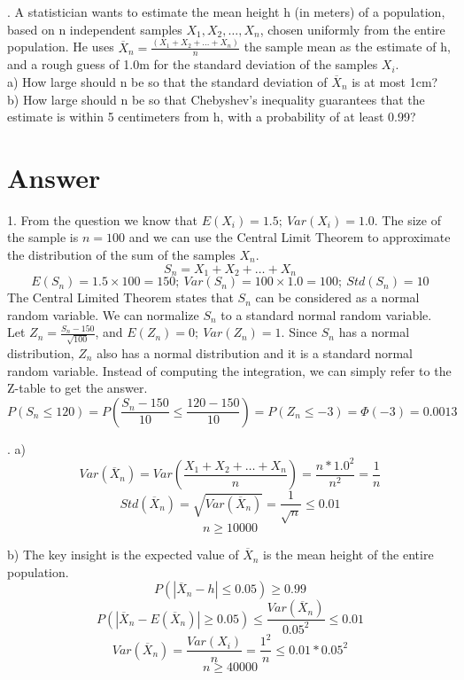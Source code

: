 \documentclass[11pt]{article}
\begin{document}
. A statistician wants to estimate the mean height h (in meters) of a population, based on n independent samples $X_1, X_2, \ldots, X_n$, chosen uniformly from the entire population.
He uses $ \overline{X}_n = \frac{(X_1+X_2+\ldots+X_n)}{n}$ the sample mean as the estimate of h, and a rough guess of 1.0m for the standard deviation of the samples $X_i$.
\\ a) How large should n be so that the standard deviation of $\overline{X}_n$ is at most 1cm?
\\ b) How large should n be so that Chebyshev's inequality guarantees that the estimate is within 5 centimeters from h, with a probability of at least 0.99?

\section{Answer}
1. From the question we know that $E(X_i) = 1.5;\:Var(X_i) = 1.0$. The size of the sample is $n=100$ and we can use the Central Limit Theorem to approximate the distribution of the sum of the samples $X_n$.
$$S_{n} = X_1 + X_2 + \ldots +X_{n}$$
$$E(S_n) = 1.5 \times 100 = 150; \: Var(S_n) = 100 \times 1.0 = 100; \: Std(S_n) = 10$$
The Central Limited Theorem states that $S_n$ can be considered as a normal random variable. 
We can normalize $S_n$ to a standard normal random variable.
Let $Z_n = \frac{S_n - 150}{\sqrt{100}}$, and $E(Z_n) = 0;\:Var(Z_n) = 1$. 
Since $S_n$ has a normal distribution, $Z_n$ also has a normal distribution and it is a standard normal random variable.
Instead of computing the integration, we can simply refer to the Z-table to get the answer.
$$P(S_n \leq 120) = P(\frac{S_n - 150}{10} \leq \frac{120 - 150}{10}) = P(Z_n \leq -3) = \Phi(-3) = 0.0013$$

.
a) 
$$Var(\overline{X}_n) = Var(\frac{X_1 + X_2 + \ldots + X_n}{n}) = \frac{n * 1.0^2}{n^2} = \frac{1}{n}$$
$$Std(\overline{X}_n) = \sqrt{Var(\overline{X}_n)} = \frac{1}{\sqrt{n}} \leq 0.01$$
$$n \geq 10000$$

b)
The key insight is the expected value of $\overline{X}_n$ is the mean height of the entire population. 
$$P(|\overline{X}_n - h| \leq 0.05) \geq 0.99 $$
$$ P(|\overline{X}_n - E(\overline{X}_n)| \geq 0.05) \leq \frac{Var(\overline{X}_n)}{0.05^2} \leq 0.01 $$
$$ Var(\overline{X}_n) = \frac{Var(X_i)}{n} = \frac{1^2}{n} \leq 0.01 * 0.05^2$$
$$n \geq 40000$$
\end{document}
